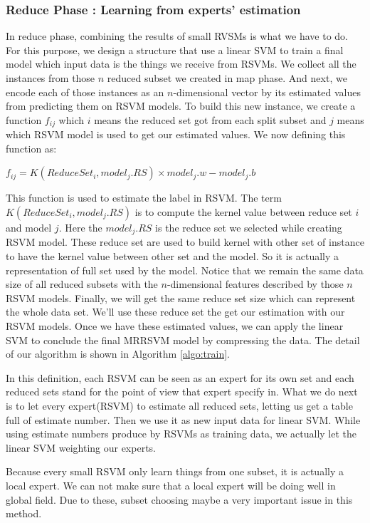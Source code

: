 \documentclass[conference]{IEEEtran}
\begin{document}
\subsubsection{Reduce Phase : Learning from experts’ estimation}
In reduce phase, combining the results of small RVSMs is what we have to do. For this purpose, we design a structure that use a linear SVM to train a final model which input data is the things we receive from RSVMs. We collect all the instances from those $n$ reduced subset we created in map phase. And next, we encode each of those instances as an $n$-dimensional vector by its estimated values from predicting them on RSVM models. To build this new instance, we create a function $f_{ij}$ which $i$ means the reduced set got from each split subset and $j$ means which RSVM model is used to get our estimated values. We now defining this function as:

\vspace{0.4cm}
$f_{ij}=K(ReduceSet_i,model_j.RS) \times model_j.w-model_j.b$
\vspace{0cm}

This function is used to estimate the label in RSVM. The term $K(ReduceSet_i,model_j.RS)$ is to compute the kernel value between reduce set $i$ and model $j$. Here the $model_j.RS$ is the reduce set we selected while creating RSVM model. These reduce set are used to build kernel with other set of instance to have the kernel value between other set and the model. So it is actually a representation of full set used by the model. Notice that we remain the same data size of all reduced subsets with the $n$-dimensional features described by those $n$ RSVM models. Finally, we will get the same reduce set size which can represent the whole data set. We'll use these reduce set the get our estimation with our RSVM models. Once we have these estimated values, we can apply the linear SVM to conclude the final MRRSVM model by compressing the data. The detail of our algorithm is shown in Algorithm \ref{algo:train}.
  
In this definition, each RSVM can be seen as an expert for its own set and each reduced sets stand for the point of view that expert specify in. What we do next is to let every expert(RSVM) to estimate all reduced sets, letting us get a table full of estimate number. Then we use it as new input data for linear SVM. While using estimate numbers produce by RSVMs as training data, we actually let the linear SVM weighting our experts. 

Because every small RSVM only learn things from one subset, it is actually a local expert. We can not make sure that a local expert will be doing well in global field. Due to these, subset choosing maybe a very important issue in this method.
\end{document}
